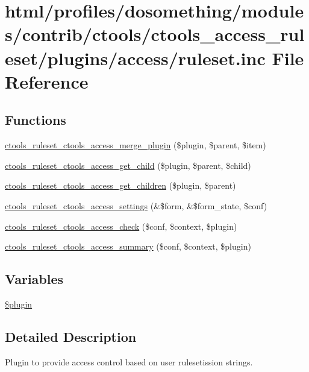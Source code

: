 \hypertarget{ruleset_8inc}{
\section{html/profiles/dosomething/modules/contrib/ctools/ctools\_\-access\_\-ruleset/plugins/access/ruleset.inc File Reference}
\label{ruleset_8inc}
}
\subsection*{Functions}
\begin{DoxyCompactItemize}
\item 
\hyperlink{ruleset_8inc_ac04d7c43fa756f79ede66680cf832fb1}{ctools\_\-ruleset\_\-ctools\_\-access\_\-merge\_\-plugin} (\$plugin, \$parent, \$item)
\item 
\hyperlink{ruleset_8inc_ac10637f0137dc2af3f6bea65d7bab95b}{ctools\_\-ruleset\_\-ctools\_\-access\_\-get\_\-child} (\$plugin, \$parent, \$child)
\item 
\hyperlink{ruleset_8inc_a5d2c8c997a7cf52f15010aecc08fba8e}{ctools\_\-ruleset\_\-ctools\_\-access\_\-get\_\-children} (\$plugin, \$parent)
\item 
\hyperlink{ruleset_8inc_a407a84f2dfed6de7b2263764110ccb9b}{ctools\_\-ruleset\_\-ctools\_\-access\_\-settings} (\&\$form, \&\$form\_\-state, \$conf)
\item 
\hyperlink{ruleset_8inc_abd7b9ca0cd1f894f773ea6943f8cc481}{ctools\_\-ruleset\_\-ctools\_\-access\_\-check} (\$conf, \$context, \$plugin)
\item 
\hyperlink{ruleset_8inc_a13856bc486eaf9b3a72905515eb79fb8}{ctools\_\-ruleset\_\-ctools\_\-access\_\-summary} (\$conf, \$context, \$plugin)
\end{DoxyCompactItemize}
\subsection*{Variables}
\begin{DoxyCompactItemize}
\item 
\hyperlink{ruleset_8inc_ada8a7130088351710bb02ed622d6bf65}{\$plugin}
\end{DoxyCompactItemize}


\subsection{Detailed Description}
Plugin to provide access control based on user rulesetission strings. 

